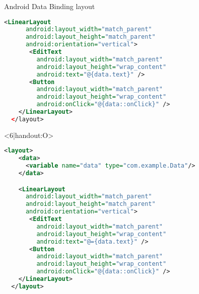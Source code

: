 \begin{frame}[fragile]{Android Data Binding layout}
\begin{onlyenv}
\begin{lstlisting}[language=XML]
    <LinearLayout
      android:layout_width="match_parent"
      android:layout_height="match_parent"
      android:orientation="vertical">
       <EditText
         android:layout_width="match_parent"
         android:layout_height="wrap_content"
         android:text="@{data.text}" />
       <Button
         android:layout_width="match_parent"
         android:layout_height="wrap_content"
         android:onClick="@{data::onClick}" />
    </LinearLayout>
  </layout>
  \end{lstlisting}
\end{onlyenv}
\begin{onlyenv}<6|handout:O>
  \begin{lstlisting}[language=XML]
  <layout>
    <data>
      <variable name="data" type="com.example.Data"/>
    </data>

    <LinearLayout
      android:layout_width="match_parent"
      android:layout_height="match_parent"
      android:orientation="vertical">
       <EditText
         android:layout_width="match_parent"
         android:layout_height="wrap_content"
         android:text="@={data.text}" />
       <Button
         android:layout_width="match_parent"
         android:layout_height="wrap_content"
         android:onClick="@{data::onClick}" />
    </LinearLayout>
  </layout>
  \end{lstlisting}
\end{onlyenv}
\end{frame}
